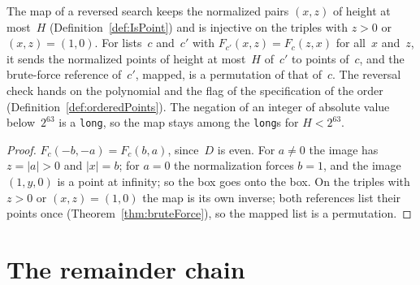 \begin{lemma}\label{lem:swapPoint_bijection}
  \leanok
  The map of a reversed search keeps the normalized pairs $(x, z)$ of height at most~$H$
  (Definition~\ref{def:IsPoint}) and is injective on the triples with $z > 0$ or $(x, z) = (1, 0)$.
  For lists~$c$ and~$c'$ with $F_{c'}(x, z) = F_c(z, x)$ for all~$x$ and~$z$, it sends the
  normalized points of height at most~$H$ of~$c'$ to points of~$c$, and the brute-force reference
  of~$c'$, mapped, is a permutation of that of~$c$. The reversal check hands on the polynomial and
  the flag of the specification of the order (Definition~\ref{def:orderedPoints}). The negation of
  an integer of absolute value below~$2^{63}$ is a \verb|long|, so the map stays among the
  \verb|long|s for $H < 2^{63}$.
\end{lemma}

\begin{proof}
  \leanok
  $F_c(-b, -a) = F_c(b, a)$, since~$D$ is even. For $a \ne 0$ the image has $z = |a| > 0$ and
  $|x| = b$; for $a = 0$ the normalization forces $b = 1$, and the image $(1, y, 0)$ is a point at
  infinity; so the box goes onto the box. On the triples with $z > 0$ or $(x, z) = (1, 0)$ the map
  is its own inverse; both references list their points once (Theorem~\ref{thm:bruteForce}), so the
  mapped list is a permutation.
\end{proof}

\section{The remainder chain}\label{sec:remainderChain}

